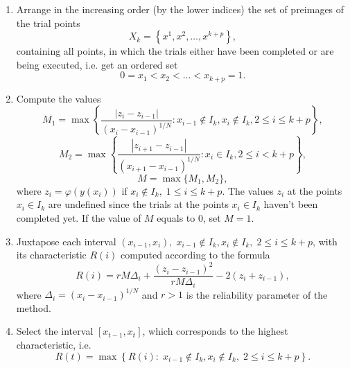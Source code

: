 \documentclass{svproc}
\begin{document}
\begin{enumerate} \item Arrange in the increasing order (by the lower indices) the set of preimages of the trial points
	\begin{displaymath} 
		X_k=\left\{x^1,x^2,\ldots,x^{k+p}\right\}, 
	\end{displaymath} 
	containing all points, in which the trials either have been completed or are being executed, i.e. get an  ordered set 
	\begin{displaymath} 
		0=x_1<x_2<\ldots<x_{k+p}=1. 
	\end{displaymath} 
	
	\item Compute the values 
	\begin{displaymath} 
		M_1=\max{\left\{\frac{\left|z_i-z_{i-1}\right|}{\left(x_i-x_{i-1}\right)^{1/N}}:x_{i-1}\notin  I_k,x_i\notin I_k,2\le i\le k+p\right\}}, 
	\end{displaymath} 
	\begin{displaymath} 
		M_2=\max{\left\{\frac{\left|z_{i+1}-z_{i-1}\right|}{\left(x_{i+1}-x_{i-1}\right)^{1/N}}:x_i\in  I_k,2\le i<k+p\right\}}, 
	\end{displaymath} 
	\begin{displaymath} 
		M=\max{\{}M_1,M_2\}, 
	\end{displaymath} 
	where $ z_i=\varphi\left(y\left(x_i\right)\right)$ if $x_i\notin I_k,\;1\le i\le k+p$. The values $z_i$ at the points $x_i\in I_k$ are undefined since the trials at the points $x_i\in I_k$ haven't been completed yet. If the value of $M$ equals to $0$, set $M=1$.
	
	\item Juxtapose each interval $\left(x_{i-1},x_i\right),\;x_{i-1}\notin I_k,x_i\notin I_k,\;2\le i\le  k+p$, with its characteristic $R\left(i\right)$ computed according to the formula 
	\begin{displaymath} 
		R\left(i\right)=rM\Delta_i+\frac{\left(z_i-z_{i-1}\right)^2}{rM\Delta_i}-2\left(z_i+z_{i-1}\right), 
	\end{displaymath} 
	where $\Delta_i=\left(x_i-x_{i-1}\right)^{1/N}$ and $ r>1$ is the reliability parameter of the method.
	
	\item Select the interval $\left[x_{t-1},x_t\right]$, which corresponds to the highest characteristic, i.e.
	\begin{displaymath} 
		R\left(t\right)=\max{\left\{R\left(i\right):\;x_{i-1}\notin I_k,x_i\notin I_k,\;2\le i\le k+p\right\}}. 
	\end{displaymath} 
	

\end{enumerate}
\end{document}
